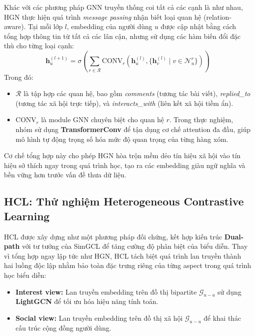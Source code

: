 \documentclass[11pt]{article}
\begin{document}
Khác với các phương pháp GNN truyền thống coi tất cả các cạnh là như nhau, HGN thực hiện quá trình \textit{message passing} nhận biết loại quan hệ (relation-aware). Tại mỗi lớp $l$, embedding của người dùng $u$ được cập nhật bằng cách tổng hợp thông tin từ tất cả các lân cận, nhưng sử dụng các hàm biến đổi đặc thù cho từng loại cạnh:
\begin{equation}
    \mathbf{h}_u^{(l+1)} = \sigma \left( \sum_{r \in \mathcal{R}} \text{CONV}_r \left( \mathbf{h}_u^{(l)}, \{ \mathbf{h}_v^{(l)} \mid v \in \mathcal{N}_u^r \} \right) \right)
    \label{eq:hetero_agg}
\end{equation}
Trong đó:
\begin{itemize}
    \item $\mathcal{R}$ là tập hợp các quan hệ, bao gồm \textit{comments} (tương tác bài viết), \textit{replied\_to} (tương tác xã hội trực tiếp), và \textit{interacts\_with} (liên kết xã hội tiềm ẩn).
    \item $\text{CONV}_r$ là module GNN chuyên biệt cho quan hệ $r$. Trong thực nghiệm, nhóm sử dụng \textbf{TransformerConv} để tận dụng cơ chế attention đa đầu, giúp mô hình tự động trọng số hóa mức độ quan trọng của từng hàng xóm.
\end{itemize}
Cơ chế tổng hợp này cho phép HGN hòa trộn mềm dẻo tín hiệu xã hội vào tín hiệu sở thích ngay trong quá trình học, tạo ra các embedding giàu ngữ nghĩa và bền vững hơn trước vấn đề thưa dữ liệu.

\subsection{HCL: Thử nghiệm Heterogeneous Contrastive Learning}
HCL được xây dựng như một phương pháp đối chứng, kết hợp kiến trúc \textbf{Dual-path} với tư tưởng của SimGCL để tăng cường độ phân biệt của biểu diễn. Thay vì tổng hợp ngay lập tức như HGN, HCL tách biệt quá trình lan truyền thành hai luồng độc lập nhằm bảo toàn đặc trưng riêng của từng aspect trong quá trình học biểu diễn:
\begin{itemize}
    \item \textbf{Interest view:} Lan truyền embedding trên đồ thị bipartite $\mathcal{G}_{u-a}$ sử dụng \textbf{LightGCN} để tối ưu hóa hiệu năng tính toán.
    \item \textbf{Social view:} Lan truyền embedding trên đồ thị xã hội $\mathcal{G}_{u-u}$ để khai thác cấu trúc cộng đồng người dùng.
\end{itemize}
\end{document}
